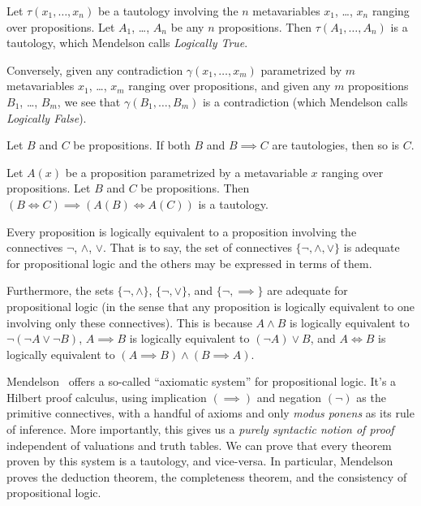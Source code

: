 \begin{node}[Semantics]
\begin{node}\label{prop-000A}%
Let $\tau(x_{1},\dots,x_{n})$ be a tautology involving the $n$
metavariables $x_{1}$, \dots, $x_{n}$ ranging over propositions. Let
$A_{1}$, \dots, $A_{n}$ be any $n$ propositions. Then $\tau(A_{1},\dots,
A_{n})$ is a tautology, which Mendelson calls \textit{Logically True}.

Conversely, given any contradiction $\gamma(x_{1},\dots, x_{m})$
parametrized by $m$ metavariables $x_{1}$, \dots, $x_{m}$ ranging over
propositions, and given any $m$ propositions $B_{1}$, \dots, $B_{m}$, we
see that $\gamma(B_{1},\dots,B_{m})$ is a contradiction (which Mendelson
calls \textit{Logically False}).
\end{node}

\begin{node}\label{prop-000B}%
Let $B$ and $C$ be propositions.
If both $B$ and $B\implies C$ are tautologies, then so is $C$.
\end{node}

\begin{node}\label{prop-000C}%
Let $A(x)$ be a proposition parametrized by a metavariable $x$ ranging
over propositions.
Let $B$ and $C$ be propositions. Then $(B\iff C)\implies(A(B)\iff A(C))$
is a tautology.
\end{node}

\begin{node}\label{prop-000E}%
Every proposition is logically equivalent to a proposition involving the
connectives $\neg$, $\land$, $\lor$. That is to say, the set of
connectives $\{\neg,\land,\lor\}$ is adequate for propositional logic
and the others may be expressed in terms of them.

Furthermore, the sets $\{\neg,\land\}$, $\{\neg,\lor\}$, and $\{\neg,\implies\}$
are adequate for propositional logic (in the sense that any proposition
is logically equivalent to one involving only these connectives). This
is because $A\land B$ is logically equivalent to $\neg(\neg A\lor\neg B)$,
$A\implies B$ is logically equivalent to $(\neg A)\lor B$, and $A\iff B$
is logically equivalent to $(A\implies B)\land(B\implies A)$.
\end{node}
\end{node}

\begin{node}\label{prop-000F}%
Mendelson~\cite[\S1.4]{mendelson2015mathematical} offers a so-called
``axiomatic system'' for propositional logic. It's a Hilbert proof
calculus, using implication $(\implies)$ and negation $(\neg)$ as the
primitive connectives, with a handful of axioms and only
\textit{modus ponens} as its rule of inference. More importantly, this
gives us a \emph{purely syntactic notion of proof} independent of
valuations and truth tables. We can prove that every theorem proven
by this system is a tautology, and vice-versa. In particular, Mendelson
proves the deduction theorem, the completeness theorem, and the consistency of
propositional logic.
\end{node}

